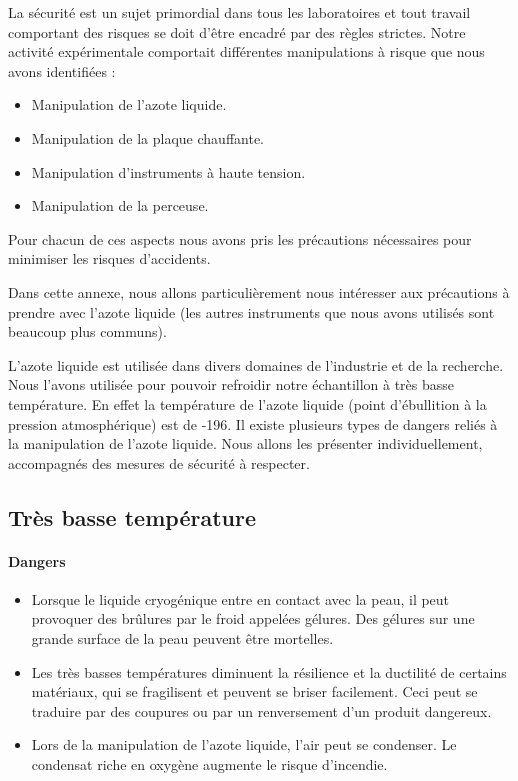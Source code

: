 La sécurité est un sujet primordial dans tous les laboratoires et tout travail comportant des risques se doit d'être encadré par des règles strictes. Notre activité expérimentale comportait différentes manipulations à risque que nous avons identifiées : 

\begin{itemize}
  \item Manipulation de l'azote liquide.
  \item Manipulation de la plaque chauffante.
  \item Manipulation d'instruments à haute tension.
  \item Manipulation de la perceuse.
\end{itemize}

\bigskip
Pour chacun de ces aspects nous avons pris les précautions nécessaires pour minimiser les risques d'accidents.

Dans cette annexe, nous allons particulièrement nous intéresser aux précautions à prendre avec l'azote liquide (les autres instruments que nous avons utilisés sont beaucoup plus communs).

L'azote liquide est utilisée dans divers domaines de l'industrie et de la recherche. Nous l'avons utilisée pour pouvoir refroidir notre échantillon à très basse température. En effet la température de l’azote liquide (point d’ébullition à la pression atmosphérique) est de -196\celsius{}. 
Il existe plusieurs types de dangers reliés à la manipulation de l'azote liquide. Nous allons les présenter individuellement, accompagnés des mesures de sécurité à respecter.

\subsection{Très basse température}

\paragraph{Dangers}

\begin{itemize}
  \item Lorsque le liquide cryogénique entre en contact avec la peau, il peut provoquer des 
brûlures par le froid appelées gélures. Des gélures sur une grande surface de la peau peuvent être mortelles. 
  \item Les très basses températures diminuent la résilience et la ductilité de certains 
matériaux, qui se fragilisent et peuvent se briser facilement. Ceci peut se traduire par des coupures ou par un renversement d'un produit dangereux.
  \item Lors de la manipulation de l'azote liquide, l’air peut se condenser. Le condensat riche en oxygène augmente le risque d'incendie.
\end{itemize}

